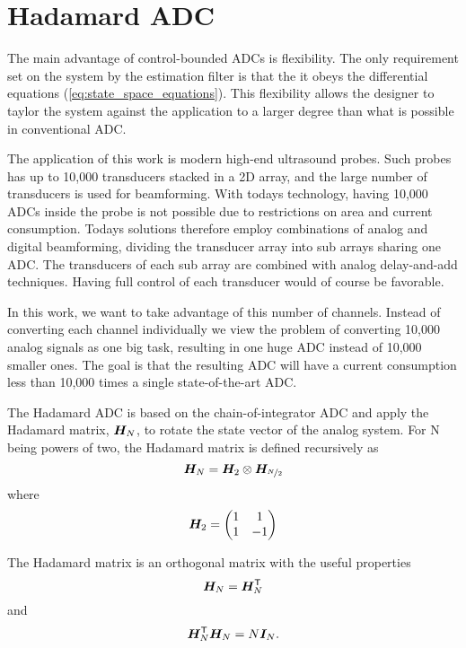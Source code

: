 
\chapter{Hadamard ADC}
The main advantage of control-bounded ADCs is flexibility. The only requirement set on the system by the estimation filter is that the it obeys the differential equations (\ref{eq:state_space_equations}). This flexibility allows the designer to taylor the system against the application to a larger degree than what is possible in conventional ADC.

The application of this work is modern high-end ultrasound probes. Such probes has up to 10,000 transducers stacked in a 2D array, and the large number of transducers is used for beamforming. With todays technology, having 10,000 ADCs inside the probe is not possible due to restrictions on area and current consumption. Todays solutions therefore employ combinations of analog and digital beamforming, dividing the transducer array into sub arrays sharing one ADC. The transducers of each sub array are combined with analog delay-and-add techniques. Having full control of each transducer would of course be favorable.

In this work, we want to take advantage of this number of channels. Instead of converting each channel individually we view the problem of converting 10,000 analog signals as one big task, resulting in one huge ADC instead of 10,000 smaller ones. The goal is that the resulting ADC will have a current consumption less than 10,000 times a single state-of-the-art ADC.

The Hadamard ADC is based on the chain-of-integrator ADC and apply the Hadamard matrix, $\bm{H_}{N}$, to rotate the state vector of the analog system. For N being powers of two, the Hadamard matrix is defined recursively as
\begin{equation}
    \label{eq:def_Hn}
    \bm{H_}{N} = \bm{H_}{2} \otimes \bm{H_}{\nicefrac{N}{2}}
\end{equation}
where
\begin{equation}
    \label{eq:def_H2}
    \bm{H_}{2} =
    \begin{pmatrix}
    1 & 1 \\
    1 & -1
    \end{pmatrix}
\end{equation}

The Hadamard matrix is an orthogonal matrix with the useful properties
\begin{equation}
    \label{eq:Hmat_symmetry}
    \bm{H_}{N} = \bm{H_}{N}^\mathsf{T}
\end{equation}
and
\begin{equation}
    \label{eq:Hmat_inverse}
    \bm{H_}{N}^\mathsf{T}\bm{H_}{N} = N\bm{I}_{N}.
\end{equation}

